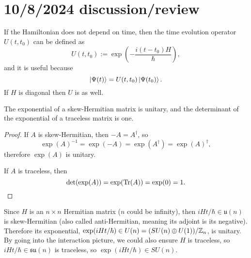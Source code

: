 \documentclass{article}
\begin{document}
\section{10/8/2024 discussion/review}
If the Hamiltonian does not depend on time, then the time evolution operator $U(t, t_0)$ can be defined as
\[ U(t, t_0) := \exp \left( - \frac{i (t - t_0) H}{\hbar} \right), \]
and it is useful because
\[ \left\lvert \Psi(t) \right\rangle = U(t, t_0) \left\lvert \Psi(t_0) \right\rangle. \]
If $H$ is diagonal then $U$ is as well.
\par
\begin{lem}
    The exponential of a skew-Hermitian matrix is unitary, and the determinant of the exponential of a traceless matrix is one.
\end{lem}
\begin{proof}
    If $A$ is skew-Hermitian, then $-A=A^\dag$, so
    \[ \exp(A)^{-1}=\exp(-A)=\exp(A^\dag)=\exp(A)^\dag, \]
    therefore $\exp(A)$ is unitary.
    \par
    If $A$ is traceless, then
    \[ \det(\exp(A)) = \exp(\operatorname{Tr}(A)) = \exp(0) = 1. \]
\end{proof}
Since $H$ is an $n \times n$ Hermitian matrix ($n$ could be infinity), then $i H t / \hbar \in \mathfrak{u}(n)$ is skew-Hermitian (also called anti-Hermitian, meaning its adjoint is its negative). Therefore its exponential, $\exp(iHt/\hbar) \in U(n) = (SU(n) \oplus U(1)) / \mathbb{Z}_n$, is unitary. By going into the interaction picture, we could also ensure $H$ is traceless, so $i H t /\hbar \in \mathfrak{su}(n)$ is traceless, so $\exp(iHt/\hbar) \in SU(n)$.
\end{document}
